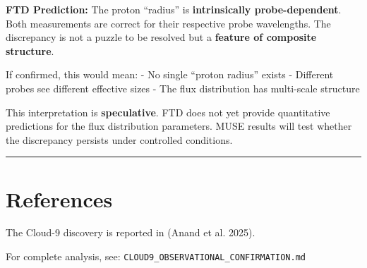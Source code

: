 \documentclass[
  11pt,
  letterpaper,
  twoside,
  openany]{book}
\makeatletter
\let\orig@section\section
\renewcommand{\section}{\needspace{8\baselineskip}\orig@section}
\makeatother
\begin{document}
\textbf{FTD Prediction:} The proton ``radius'' is \textbf{intrinsically
probe-dependent}. Both measurements are correct for their respective
probe wavelengths. The discrepancy is not a puzzle to be resolved but a
\textbf{feature of composite structure}.

If confirmed, this would mean: - No single ``proton radius'' exists -
Different probes see different effective sizes - The flux distribution
has multi-scale structure

\begin{tcolorbox}[enhanced jigsaw, colbacktitle=quarto-callout-warning-color!10!white, titlerule=0mm, bottomtitle=1mm, bottomrule=.15mm, colback=white, arc=.35mm, breakable, toprule=.15mm, title=\textcolor{quarto-callout-warning-color}{\faExclamationTriangle}\hspace{0.5em}{Epistemic Status}, rightrule=.15mm, coltitle=black, leftrule=.75mm, colframe=quarto-callout-warning-color-frame, toptitle=1mm, opacityback=0, opacitybacktitle=0.6, left=2mm]

This interpretation is \textbf{speculative}. FTD does not yet provide
quantitative predictions for the flux distribution parameters. MUSE
results will test whether the discrepancy persists under controlled
conditions.

\end{tcolorbox}

\begin{center}\rule{0.5\linewidth}{0.5pt}\end{center}

\section{References}\label{sec-obs-refs}

The Cloud-9 discovery is reported in (Anand et al. 2025).

For complete analysis, see:
\texttt{CLOUD9\_OBSERVATIONAL\_CONFIRMATION.md}
\end{document}
